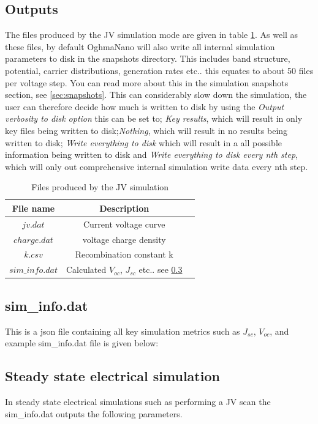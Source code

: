 \subsection{Outputs}
The files produced by the JV simulation mode are given in table \ref{tab:jv_output}. As well as these files, by default OghmaNano will also write all internal simulation parameters to disk in the snapshots directory. This includes band structure, potential, carrier distributions, generation rates etc.. this equates to about 50 files per voltage step. You can read more about this in the simulation snapshots section, see \ref{sec:snapshots}. This can considerably slow down the simulation, the user can therefore decide how much is written to disk by using the \emph{Output verbosity to disk option} this can be set to; \emph{Key results}, which will result in only key files being written to disk;\emph{Nothing}, which will result in no results being written to disk; \emph{Write everything to disk} which will result in a all possible information being written to disk and \emph{Write everything to disk every nth step}, which will only out comprehensive internal simulation write data every nth step.

\begin{table}[H]
\begin{center}
\begin{tabular}{ |c|c|c| } 
 \hline
	File name 			& 	Description  \\ 
 \hline
	$jv.dat$ 			&	Current voltage curve \\ 
	$charge.dat$ 		&	voltage charge density\\ 
	$k.csv$ 			&	Recombination constant k\\ 
	$sim\_info.dat$ 	&	Calculated $V_{oc}$, $J_{sc}$ etc.. see \ref{sec:siminfo}   \\

 \hline
\end{tabular}
\caption{Files produced by the JV simulation}
\label{tab:jv_output}
\end{center}
\end{table}

\subsection{sim\_info.dat}
\label{sec:siminfo}
This is a json file containing all key simulation metrics such as $J_{sc}$, $V_{oc}$, and example sim\_info.dat file is given below:


\subsection{Steady state electrical simulation}
\label{sec:siminfo}
In steady state electrical simulations such as performing a JV scan the sim\_info.dat outputs the following parameters.

